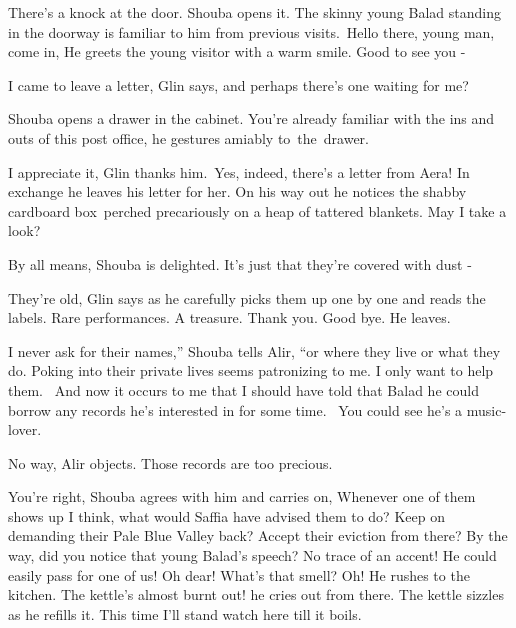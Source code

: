 \documentclass[letterpaper]{article}
\begin{document}
There's a knock at the door. Shouba opens it. The skinny young Balad standing in the doorway is familiar to him from
previous visits.\ {\textquotedbl}Hello there, young man, come in,{\textquotedbl} He greets the young visitor with a
warm smile. {\textquotedbl}Good to see you -{\textquotedbl} 

{\textquotedbl}I came to leave a letter,{\textquotedbl} Glin says, {\textquotedbl}and perhaps there's one waiting for
me?{\textquotedbl}

Shouba opens a drawer in the cabinet. {\textquotedbl}You're already familiar with the ins and outs of this post
office,{\textquotedbl} he gestures amiably to~the~drawer.

{\textquotedbl}I appreciate it,{\textquotedbl} Glin thanks him.\ Yes, indeed, there's a letter from Aera! In exchange he
leaves his letter for her. On his way out he notices the shabby cardboard box\ perched precariously on a heap of
tattered blankets. {\textquotedbl}May I take a look?{\textquotedbl} \ 

{\textquotedbl}By all means,{\textquotedbl} Shouba is delighted. {\textquotedbl}It's just that they're covered with dust
-{\textquotedbl} 

{\textquotedbl}They're old,{\textquotedbl} Glin says as he carefully picks them up one by one and reads the labels.
{\textquotedbl}Rare performances. A treasure. Thank you. Good bye.{\textquotedbl} He leaves.\ 

{\textquotedbl}I never ask for their names,'' Shouba tells Alir, ``or where they live or what they do. Poking into their
private lives seems patronizing to me. I only want to help them. ~And now it occurs to me that I should have told that
Balad he could borrow any records he's interested in for some time. \ You could see he's a music-lover.{\textquotedbl} 

{\textquotedbl}No way,{\textquotedbl} Alir objects. {\textquotedbl}Those records are too precious.{\textquotedbl} 

{\textquotedbl}You're right,{\textquotedbl} Shouba agrees with him and carries on, {\textquotedbl}Whenever one of them
shows up I think, what would Saffia have advised them to do? Keep on demanding their Pale Blue Valley back? Accept
their eviction from there? By the way, did you notice that young Balad{}'s speech? No trace of an accent! He could
easily pass for one of us! Oh dear! What's that smell? Oh!{\textquotedbl} He rushes to the kitchen. {\textquotedbl}The
kettle's almost burnt out!{\textquotedbl} he cries out from there. The kettle sizzles as he refills it.
{\textquotedbl}This time I'll stand watch here till it boils.{\textquotedbl}\ 
\end{document}
